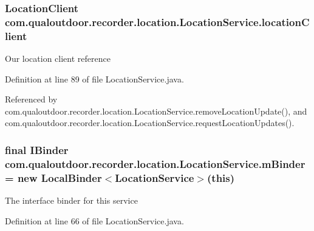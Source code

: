 \hypertarget{classcom_1_1qualoutdoor_1_1recorder_1_1location_1_1LocationService_ac762380166c206994d17c087bc1c8fe1}{
\subsubsection[{location\-Client}]{\setlength{\rightskip}{0pt plus 5cm}Location\-Client com.\-qualoutdoor.\-recorder.\-location.\-Location\-Service.\-location\-Client\hspace{0.3cm}{\ttfamily [private]}}}\label{classcom_1_1qualoutdoor_1_1recorder_1_1location_1_1LocationService_ac762380166c206994d17c087bc1c8fe1}
Our location client reference 

Definition at line 89 of file Location\-Service.\-java.



Referenced by com.\-qualoutdoor.\-recorder.\-location.\-Location\-Service.\-remove\-Location\-Update(), and com.\-qualoutdoor.\-recorder.\-location.\-Location\-Service.\-request\-Location\-Updates().

\hypertarget{classcom_1_1qualoutdoor_1_1recorder_1_1location_1_1LocationService_adedcf04f6459e4109593aec315902c3f}{
\subsubsection[{m\-Binder}]{\setlength{\rightskip}{0pt plus 5cm}final I\-Binder com.\-qualoutdoor.\-recorder.\-location.\-Location\-Service.\-m\-Binder = new Local\-Binder$<${\bf Location\-Service}$>$(this)\hspace{0.3cm}{\ttfamily [private]}}}\label{classcom_1_1qualoutdoor_1_1recorder_1_1location_1_1LocationService_adedcf04f6459e4109593aec315902c3f}
The interface binder for this service 

Definition at line 66 of file Location\-Service.\-java.

